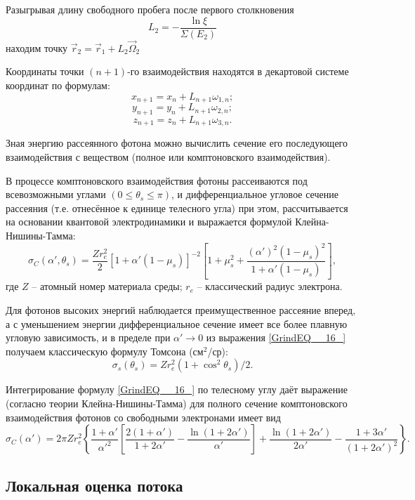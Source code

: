 \documentclass[
11pt,
master, %
subf, %
href, %
colorlinks=true, %
]{disser}
\begin{document}
Разыгрывая длину свободного пробега после первого столкновения
$$L_{2} =-\frac{\ln \xi }{\Sigma (E_{2} )} $$ 
находим точку $\vec{r}_{2} =\vec{r}_{1} +L_{2} \vec{\Omega }_{2} $

Координаты точки $(n+1)$-го взаимодействия находятся в декартовой системе координат по формулам:
$$x_{n+1} =x_{n} +L_{n+1} \omega _{1,n} ;$$
$$y_{n+1} =y_{n} +L_{n+1} \omega _{2,n} ;$$
$$z_{n+1} =z_{n} +L_{n+1} \omega _{3,n} .$$

Зная энергию рассеянного фотона можно вычислить сечение его последующего взаимодействия с веществом (полное или комптоновского взаимодействия).

В процессе комптоновского взаимодействия фотоны рассеиваются под всевозможными углами $(0 \le \theta_{s} \le \pi )$, и дифференциальное угловое сечение рассеяния (т.е. отнесённое к единице телесного угла) при этом, рассчитывается на основании квантовой электродинамики и выражается формулой Клейна-Нишины-Тамма:
\begin{equation} \label{GrindEQ__16_}
\sigma _{C} \left(\alpha ',\theta _{s} \right)=\frac{Zr_{e} ^{2} }{2} \left[1+\alpha '(1-\mu _{s} )\right]^{-2} \left[1+\mu _{s} ^{2} +\frac{\left(\alpha ' \right)^{2} (1-\mu _{s} )^{2} }{1+\alpha '(1-\mu _{s} )} \right],
\end{equation}
где $Z$ -- атомный номер материала среды; $r_{e}$ -- классический радиус электрона.

Для фотонов высоких энергий наблюдается преимущественное рассеяние вперед, а с уменьшением энергии дифференциальное сечение имеет все более плавную угловую зависимость, и в пределе при $\alpha '\to 0$ из выражения \eqref{GrindEQ__16_} получаем классическую формулу Томсона (см${}^{2}$/ср):
\[
\sigma _{s} \left(\theta _{s} \right) = Zr_{e} ^{2} \left(1+\cos ^{2} \theta _{s} \right)/2.
\]

Интегрирование формулу \eqref{GrindEQ__16_} по телесному углу даёт выражение (согласно теории Клейна-Нишины-Тамма) для полного сечение комптоновского взаимодействия фотонов со свободными электронами имеет вид
\begin{equation} \label{GrindEQ__17_}
\sigma _{C} (\alpha ')=2\pi Zr_{e}^{2} \left\{\frac{1+\alpha '}{\alpha '^{2} } \left[\frac{2(1+\alpha ')}{1+2\alpha '} -\frac{\ln (1+2\alpha ')}{\alpha '} \right]+\frac{\ln (1+2\alpha ')}{2\alpha '} -\frac{1+3\alpha '}{(1+2\alpha ')^{2} } \right\}.
\end{equation}


\subsection{Локальная оценка потока}
\end{document}
